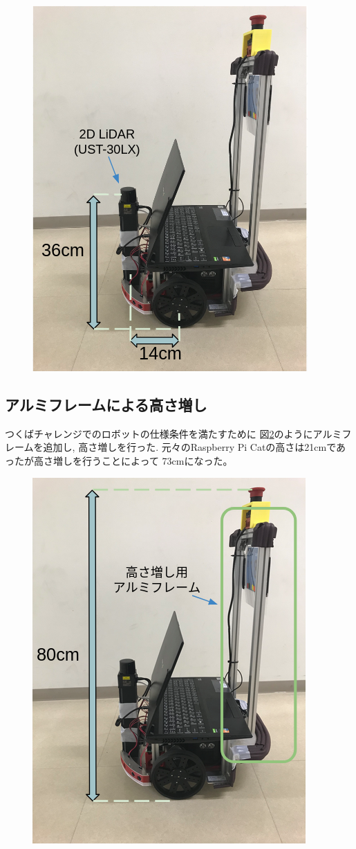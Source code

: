 \begin{figure}[H]
	\begin{center}
		\includegraphics[width=0.5\linewidth]{figs/raspicat-lidar.png}
		\caption{}
		\label{fig:raspicat-lidar}
	\end{center}
\end{figure}

\subsection{アルミフレームによる高さ増し}
つくばチャレンジでのロボットの仕様条件を満たすために
図\ref{fig:raspicat-alumiframe}のようにアルミフレームを追加し, 高さ増しを行った.
元々のRaspberry Pi Catの高さは21cmであったが高さ増しを行うことによって
73cmになった。

\begin{figure}[H]
	\begin{center}
		\includegraphics[width=0.5\linewidth]{figs/raspicat-alumiframe.png}
		\caption{}
		\label{fig:raspicat-alumiframe}
	\end{center}
\end{figure}